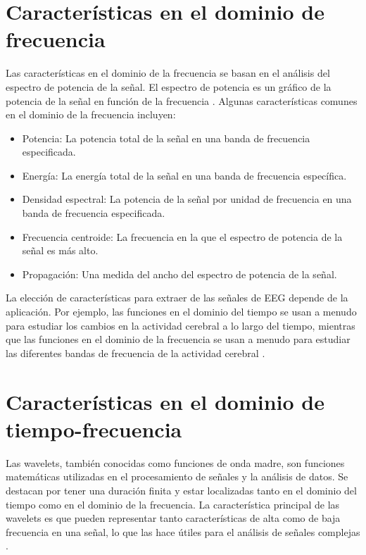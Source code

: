 \section{Características en el dominio de frecuencia}
Las características en el dominio de la frecuencia se basan en el análisis del espectro de potencia de la señal. El espectro de potencia es un gráfico de la potencia de la señal en función de la frecuencia \cite{carac_freq}. Algunas características comunes en el dominio de la frecuencia incluyen:
\begin{itemize}
    \item Potencia: 
    La potencia total de la señal en una banda de frecuencia especificada.
    \item Energía: 
    La energía total de la señal en una banda de frecuencia específica.
    \item Densidad espectral: 
    La potencia de la señal por unidad de frecuencia en una banda de frecuencia especificada.
    \item Frecuencia centroide: 
    La frecuencia en la que el espectro de potencia de la señal es más alto.
    \item Propagación: 
    Una medida del ancho del espectro de potencia de la señal.
\end{itemize}

La elección de características para extraer de las señales de EEG depende de la aplicación. Por ejemplo, las funciones en el dominio del tiempo se usan a menudo para estudiar los cambios en la actividad cerebral a lo largo del tiempo, mientras que las funciones en el dominio de la frecuencia se usan a menudo para estudiar las diferentes bandas de frecuencia de la actividad cerebral \cite{al2014methods}.

\section{Características en el dominio de tiempo-frecuencia}
Las wavelets, también conocidas como funciones de onda madre, son funciones matemáticas utilizadas en el procesamiento de señales y la análisis de datos. Se destacan por tener una duración finita y estar localizadas tanto en el dominio del tiempo como en el dominio de la frecuencia. La característica principal de las wavelets es que pueden representar tanto características de alta como de baja frecuencia en una señal, lo que las hace útiles para el análisis de señales complejas \cite{wavelet_intro}.

